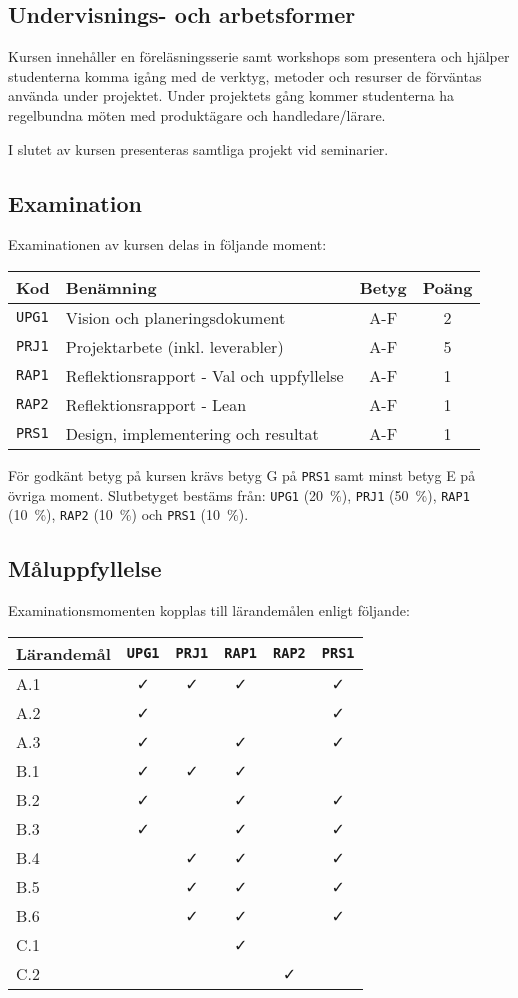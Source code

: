\subsection*{Undervisnings- och
arbetsformer}

Kursen innehåller en föreläsningsserie samt workshops som presentera och
hjälper studenterna komma igång med de verktyg, metoder och resurser de
förväntas använda under projektet. Under projektets gång kommer
studenterna ha regelbundna möten med produktägare och handledare/lärare.

I slutet av kursen presenteras samtliga projekt vid seminarier.

\subsection*{Examination}

Examinationen av kursen delas in följande moment:

\begin{longtable}[]{@{}llcc@{}}
\toprule
\textsf{Kod} & \textsf{Benämning} & \textsf{Betyg} & \textsf{Poäng}\tabularnewline
\midrule
\endhead
\texttt{UPG1} & Vision och planeringsdokument & A-F & 2\tabularnewline
\texttt{PRJ1} & Projektarbete (inkl. leverabler) & A-F & 5\tabularnewline
\texttt{RAP1} & Reflektionsrapport - Val och uppfyllelse & A-F & 1\tabularnewline
\texttt{RAP2} & Reflektionsrapport - Lean & A-F & 1\tabularnewline
\texttt{PRS1} & Design, implementering och resultat & A-F & 1\tabularnewline
\bottomrule
\end{longtable}

För godkänt betyg på kursen krävs betyg G på \texttt{PRS1} samt minst betyg E på
övriga moment. Slutbetyget bestäms från: \texttt{UPG1} (20~\%), \texttt{PRJ1} (50~\%), \texttt{RAP1}
(10~\%), \texttt{RAP2} (10~\%) och \texttt{PRS1} (10~\%).

\subsection*{Måluppfyllelse}

Examinationsmomenten kopplas till lärandemålen enligt följande:

\begin{longtable}[]{@{}lccccc@{}}
\toprule
\textsf{Lärandemål} & \texttt{UPG1} & \texttt{PRJ1} & \texttt{RAP1} & \texttt{RAP2} & \texttt{PRS1}\tabularnewline
\midrule
\endhead
A.1 & \faCheck & \faCheck & \faCheck & & \faCheck\tabularnewline
A.2 & \faCheck & & & & \faCheck\tabularnewline
A.3 & \faCheck & & \faCheck & & \faCheck\tabularnewline
B.1 & \faCheck & \faCheck & \faCheck & &\tabularnewline
B.2 & \faCheck & & \faCheck & & \faCheck\tabularnewline
B.3 & \faCheck & & \faCheck & & \faCheck\tabularnewline
B.4 & & \faCheck & \faCheck & & \faCheck\tabularnewline
B.5 & & \faCheck & \faCheck & & \faCheck\tabularnewline
B.6 & & \faCheck & \faCheck & & \faCheck\tabularnewline
C.1 & & & \faCheck & &\tabularnewline
C.2 & & & & \faCheck &\tabularnewline
\bottomrule
\end{longtable}


